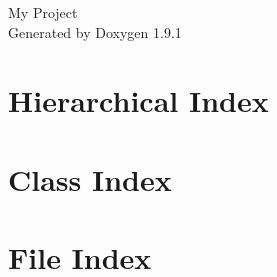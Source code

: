 \let\mypdfximage\pdfximage\def\pdfximage{\immediate\mypdfximage}\documentclass[twoside]{book}
\newcommand{\+}{\discretionary{\mbox{\scriptsize$\hookleftarrow$}}{}{}}
\newcommand{\clearemptydoublepage}{%
  \newpage{\pagestyle{empty}\cleardoublepage}%
}
\begin{document}
\raggedbottom

\hypersetup{pageanchor=false,
             bookmarksnumbered=true,
             pdfencoding=unicode
            }
\begin{titlepage}
\vspace*{7cm}
\begin{center}%
{\Large My Project }\\
\vspace*{1cm}
{\large Generated by Doxygen 1.9.1}\\
\end{center}
\end{titlepage}
\clearemptydoublepage
{}
\tableofcontents
\clearemptydoublepage
{}
\hypersetup{pageanchor=true}

\chapter{Hierarchical Index}

\chapter{Class Index}

\chapter{File Index}

\end{document}
